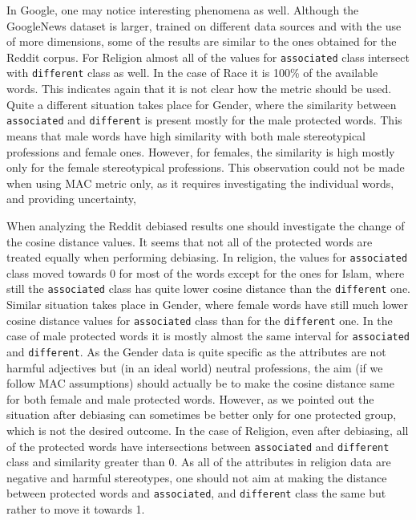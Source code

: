 \documentclass[
  12pt,
]{book}
\begin{document}
In Google, one may notice interesting phenomena as well. Although the GoogleNews dataset is larger, trained on different data sources and with the use of more dimensions, some of the results are similar to the ones obtained for the Reddit corpus. For Religion almost all of the values for \texttt{associated} class intersect with \texttt{different} class as well. In the case of Race it is 100\% of the available words. This indicates again that it is not clear how the metric should be used. Quite a different situation takes place for Gender, where the similarity between \texttt{associated} and \texttt{different} is present mostly for the male protected words. This means that male words have high similarity with both male stereotypical professions and female ones. However, for females, the similarity is high mostly only for the female stereotypical professions. This observation could not be made when using MAC metric only, as it requires investigating the individual words, and providing uncertainty,

When analyzing the Reddit debiased results one should investigate the change of the cosine distance values. It seems that not all of the protected words are treated equally when performing debiasing. In religion, the values for \texttt{associated} class moved towards 0 for most of the words except for the ones for Islam, where still the \texttt{associated} class has quite lower cosine distance than the \texttt{different} one. Similar situation takes place in Gender, where female words have still much lower cosine distance values for \texttt{associated} class than for the \texttt{different} one. In the case of male protected words it is mostly almost the same interval for \texttt{associated} and \texttt{different}. As the Gender data is quite specific as the attributes are not harmful adjectives but (in an ideal world) neutral professions, the aim (if we follow MAC assumptions) should actually be to make the cosine distance same for both female and male protected words. However, as we pointed out the situation after debiasing can sometimes be better only for one protected group, which is not the desired outcome. In the case of Religion, even after debiasing, all of the protected words have intersections between \texttt{associated} and \texttt{different} class and similarity greater than 0. As all of the attributes in religion data are negative and harmful stereotypes, one should not aim at making the distance between protected words and \texttt{associated}, and \texttt{different} class the same but rather to move it towards 1.
\end{document}
